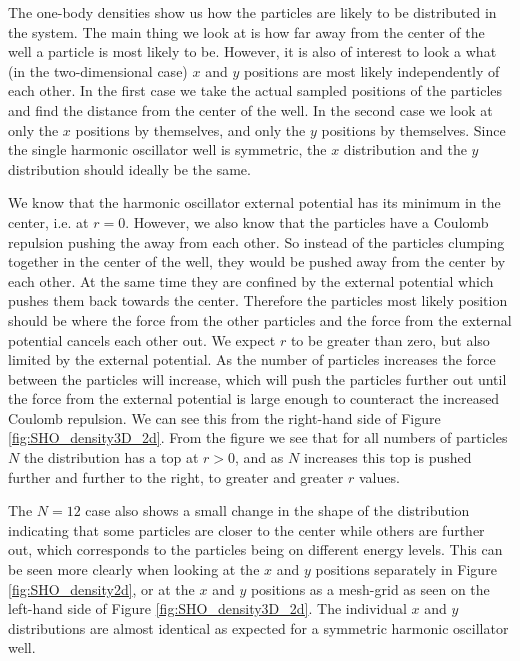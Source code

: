 \documentclass[../main.tex]{subfiles}
\begin{document}
The one-body densities show us how the particles are likely to be distributed in the system. The main thing we look at is how far away from the center of the well a particle is most likely to be. However, it is also of interest to look a what (in the two-dimensional case) $x$ and $y$ positions are most likely independently of each other. In the first case we take the actual sampled positions of the particles and find the distance from the center of the well. In the second case we look at only the $x$ positions by themselves, and only the $y$ positions by themselves. Since the single harmonic oscillator well is symmetric, the $x$ distribution and the $y$ distribution should ideally be the same. 

We know that the harmonic oscillator external potential has its minimum in the center, i.e. at $r=0$. However, we also know that the particles have a Coulomb repulsion pushing the away from each other. So instead of the particles clumping together in the center of the well, they would be pushed away from the center by each other. At the same time they are confined by the external potential which pushes them back towards the center. Therefore the particles most likely position should be where the force from the other particles and the force from the external potential cancels each other out. We expect $r$ to be greater than zero, but also limited by the external potential. As the number of particles increases the force between the particles will increase, which will push the particles further out until the force from the external potential is large enough to counteract the increased Coulomb repulsion. We can see this from the right-hand side of Figure \ref{fig:SHO_density3D_2d}. From the figure we see that for all numbers of particles $N$ the distribution has a top at $r>0$, and as $N$ increases this top is pushed further and further to the right, to greater and greater $r$ values. 

The $N=12$ case also shows a small change in the shape of the distribution indicating that some particles are closer to the center while others are further out, which corresponds to the particles being on different energy levels. This can be seen more clearly when looking at the $x$ and $y$ positions separately in Figure \ref{fig:SHO_density2d}, or at the $x$ and $y$ positions as a mesh-grid as seen on the left-hand side of Figure \ref{fig:SHO_density3D_2d}. The individual $x$ and $y$ distributions are almost identical as expected for a symmetric harmonic oscillator well.
\end{document}
